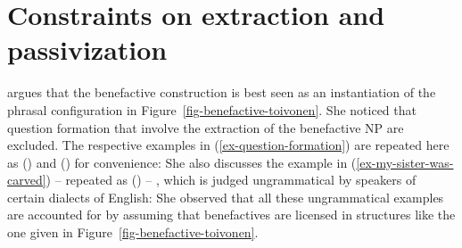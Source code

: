 



\section{Constraints on extraction and passivization}
\label{sec-restrictions-lexical}

\citet[]{Toivonen2013a} argues that the benefactive construction is best seen as an
instantiation of the phrasal configuration in Figure~\vref{fig-benefactive-toivonen}.
She noticed that question formation that involve the extraction of the benefactive NP are
excluded. The respective examples in (\ref{ex-question-formation}) are repeated here as ()
and () for convenience: 
\eal
{}
\zl
\eal
{}
\zl
She also discusses the example in (\ref{ex-my-sister-was-carved}) -- repeated as () -- , which is judged ungrammatical by speakers of certain
dialects of English:
\z
She observed that all these ungrammatical examples are accounted for by assuming that benefactives
are licensed in structures like the one given in Figure~\ref{fig-benefactive-toivonen}.

